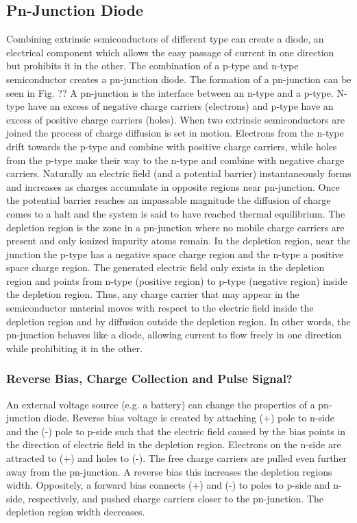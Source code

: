 \subsection{Pn-Junction Diode}
Combining extrinsic semiconductors of different type can create a diode, an electrical component which allows the easy passage of current in one direction but prohibits it in the other. The combination of a p-type and n-type semiconductor creates a pn-junction diode. The formation of a pn-junction can be seen in Fig. ??
A pn-junction is the interface between an n-type and a p-type. N-type have an excess of negative charge carriers (electrons) and p-type have an excess of positive charge carriers (holes). When two extrinsic semiconductors are joined the process of charge diffusion is set in motion. Electrons from the n-type drift towards the p-type and combine with positive charge carriers, while holes from the p-type make their way to the n-type and combine with negative charge carriers. Naturally an electric field (and a potential barrier) instantaneously forms and increases as charges accumulate in opposite regions near pn-junction. Once the potential barrier reaches an impassable magnitude the diffusion of charge comes to a halt and the system is said to have reached thermal equilibrium. The depletion region is the zone in a pn-junction where no mobile charge carriers are present and only ionized impurity atoms remain. In the depletion region, near the junction the p-type has a negative space charge region and the n-type a positive space charge region. The generated electric field only exists in the depletion region and points from n-type (positive region) to p-type (negative region) inside the depletion region. Thus, any charge carrier that may appear in the semiconductor material moves with respect to the electric field inside the depletion region and by diffusion outside the depletion region. In other words, the pn-junction behaves like a diode, allowing current to flow freely in one direction while prohibiting it in the other.

\subsubsection{Reverse Bias, Charge Collection and Pulse Signal?} %
An external voltage source (e.g. a battery) can change the properties of a pn-junction diode. Reverse bias voltage is created by attaching (+) pole to n-side and the (-) pole to p-side such that the electric field caused by the bias points in the direction of electric field in the depletion region.  Electrons on the n-side are attracted to (+) and holes to (-). The free charge carriers are pulled even further away from the pn-junction. A reverse bias this increases the depletion regions width.
Oppositely, a forward bias connects (+) and (-) to poles to p-side and n-side, respectively, and pushed charge carriers closer to the pn-junction. The depletion region width decreases.

